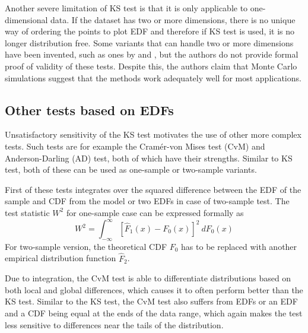 \documentclass[english, oneside]{HYgradu}
\begin{document}
Another severe limitation of KS test is that it is only applicable to one-dimensional data. If the dataset has two or more dimensions, there is no unique way of ordering the points to plot EDF and therefore if KS test is used, it is no longer distribution free. Some variants that can handle two or more dimensions have been invented, such as ones by \citet{peacock1983twodimensional} and \citet{fasano1987multidimensional}, but the authors do not provide formal proof of validity of these tests. Despite this, the authors claim that Monte Carlo simulations suggest that the methods work adequately well for most applications. \citep{press2007numerical}



\subsection{Other tests based on EDFs}
\reversemarginpar
{}
Unsatisfactory sensitivity of the KS test motivates the use of other more complex tests. Such tests are for example the Cram\'er-von Mises test (CvM) and Anderson-Darling (AD) test, both of which have their strengths. Similar to KS test, both of these can be used as one-sample or two-sample variants.  \citep{bohm2010introduction, feigelson2012modern}

First of these tests integrates over the squared difference between the EDF of the sample and CDF from the model or two EDFs in case of two-sample test. The test statistic $W^2$ for one-sample case can be expressed formally as
\begin{equation}
	W^2 = \int_{-\infty}^{\infty}[\hat F_1(x) - F_0(x)]^2\ dF_0(x)
\end{equation}
For two-sample version, the theoretical CDF $F_0$ has to be replaced with another empirical distribution function $\hat F_2$. \citep{bohm2010introduction, feigelson2012modern}

Due to integration, the CvM test is able to differentiate distributions based on both local and global differences, which causes it to often perform better than the KS test. Similar to the KS test, the CvM test also suffers from EDFs or an EDF and a CDF being equal at the ends of the data range, which again makes the test less sensitive to differences near the tails of the distribution. \citep{feigelson2012modern}
\end{document}

